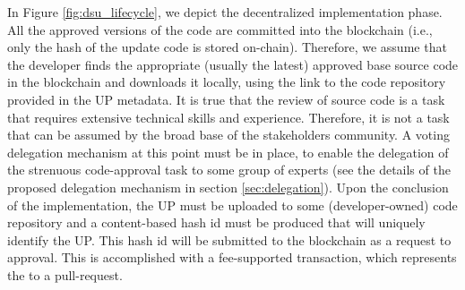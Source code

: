 In Figure \ref{fig:dsu_lifecycle}, we depict the decentralized implementation 
phase. All the approved versions of the code are committed into the blockchain 
(i.e., only the hash of the update code is stored on-chain). Therefore, we 
assume that the developer finds the appropriate (usually the latest) approved 
base source code in the blockchain and downloads it locally, using the link to 
the %
 code repository provided in the UP metadata. %
It is true that the review of source code is a task that requires extensive 
technical skills and experience. Therefore, it is not a task that can be 
assumed by the broad base of the stakeholders community. A voting delegation 
mechanism at this point must be in place, to enable the delegation of the 
strenuous code-approval task to some group of experts (see the details of the 
proposed delegation mechanism in section \ref{sec:delegation}). 
Upon the conclusion of the implementation, the UP must be uploaded to some (developer-owned) code repository and a content-based hash id must be produced that will uniquely identify the UP. This hash id will be submitted to the blockchain as a request to approval. This is accomplished with a fee-supported transaction, which represents the  to a pull-request.

